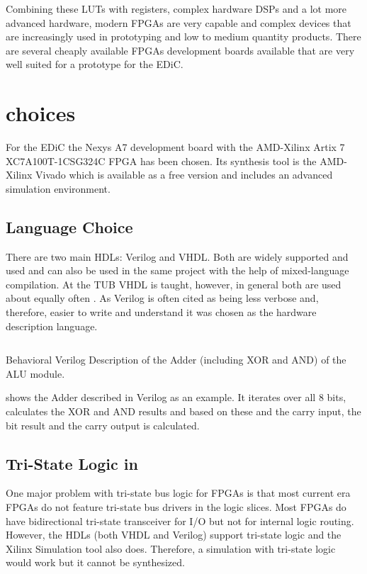 Combining these \glspl{LUT} with registers, complex hardware \glspl{DSP} and a lot more advanced hardware, modern \glspl{FPGA} are very capable and complex devices that are increasingly used in prototyping and low to medium quantity products.
There are several cheaply available \glspl{FPGA} development boards available that are very well suited for a prototype for the \gls{EDiC}.

\section{ choices}
For the \gls{EDiC} the Nexys A7 development board \cite{nexysA7} with the AMD-Xilinx Artix 7 XC7A100T-1CSG324C \gls{FPGA} has been chosen.
Its synthesis tool is the AMD-Xilinx Vivado \cite{vivado} which is available as a free version and includes an advanced simulation environment.

\subsection{Language Choice}
There are two main \glspl{HDL}: Verilog and \gls{VHDL}.
Both are widely supported and used and can also be used in the same project with the help of mixed-language compilation.
At the \gls{TUB} \gls{VHDL} is taught, however, in general both are used about equally often \cite{vhdlVerilog}.
As Verilog is often cited as being less verbose and, therefore, easier to write and understand it was chosen as the hardware description language.

\begin{listing}
  \inputminted[linenos,
    breaklines,
    firstline=65,
    lastline=71,
    frame=leftline,
    xleftmargin=20pt,
  ]{verilog}{src/alu.v}
  \caption{Behavioral Verilog Description of the Adder (including XOR and AND) of the \gls{ALU} module.}
  \label{lst:alu}
\end{listing}
 shows the Adder described in Verilog as an example.
It iterates over all 8 bits, calculates the XOR and AND results and based on these and the carry input, the bit result and the carry output is calculated.

\subsection{Tri-State Logic in }
One major problem with tri-state bus logic for \glspl{FPGA} is that most current era \glspl{FPGA} do not feature tri-state bus drivers in the logic slices.
Most \glspl{FPGA} do have bidirectional tri-state transceiver for I/O but not for internal logic routing.
However, the \glspl{HDL} (both \gls{VHDL} and Verilog) support tri-state logic and the Xilinx Simulation tool also does.
Therefore, a simulation with tri-state logic would work but it cannot be synthesized.

